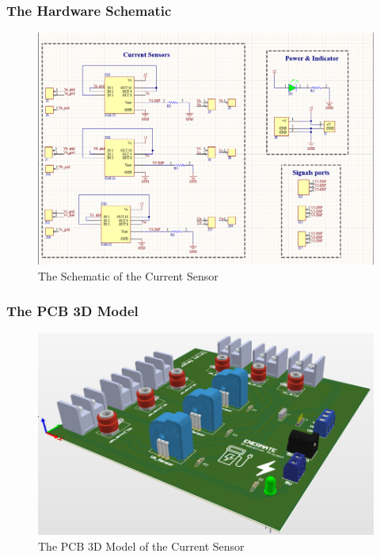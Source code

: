 \documentclass[12pt,a4paper]{book}
\begin{document}
\subsubsection{The Hardware Schematic}
\begin{figure}[h!]
  \centering
  \includegraphics[width = 17cm]{image33.png}
  \caption{The Schematic of the Current Sensor}
  \label{fig:image33}
\end{figure}

\subsubsection{The PCB 3D Model}
\begin{figure}[h!]
  \centering
  \includegraphics[width = 12cm]{image34.png}
  \caption{The PCB 3D Model of the Current Sensor}
  \label{fig:image34}
\end{figure}
\end{document}
